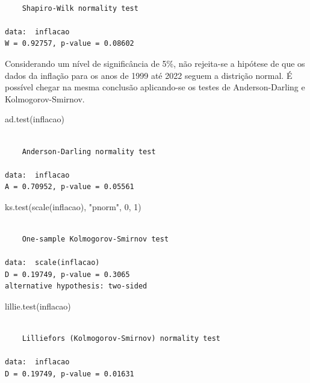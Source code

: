 \documentclass[
  letterpaper,
  DIV=11,
  numbers=noendperiod]{scrartcl}
\newenvironment{Shaded}{\begin{snugshade}}{\end{snugshade}}
\newcommand{\DecValTok}[1]{\textcolor[rgb]{0.68,0.00,0.00}{#1}}
\newcommand{\FunctionTok}[1]{\textcolor[rgb]{0.28,0.35,0.67}{#1}}
\newcommand{\NormalTok}[1]{\textcolor[rgb]{0.00,0.23,0.31}{#1}}
\newcommand{\StringTok}[1]{\textcolor[rgb]{0.13,0.47,0.30}{#1}}
\begin{document}
\begin{verbatim}

    Shapiro-Wilk normality test

data:  inflacao
W = 0.92757, p-value = 0.08602
\end{verbatim}

Considerando um nível de significância de 5\%, não rejeita-se a hipótese
de que os dados da inflação para os anos de 1999 até 2022 seguem a
distrição normal. É possível chegar na mesma conclusão aplicando-se os
testes de Anderson-Darling e Kolmogorov-Smirnov.

\begin{Shaded}
\begin{Highlighting}[]
\FunctionTok{ad.test}\NormalTok{(inflacao)}
\end{Highlighting}
\end{Shaded}

\begin{verbatim}

    Anderson-Darling normality test

data:  inflacao
A = 0.70952, p-value = 0.05561
\end{verbatim}

\begin{Shaded}
\begin{Highlighting}[]
\FunctionTok{ks.test}\NormalTok{(}\FunctionTok{scale}\NormalTok{(inflacao), }\StringTok{"pnorm"}\NormalTok{, }\DecValTok{0}\NormalTok{, }\DecValTok{1}\NormalTok{)}
\end{Highlighting}
\end{Shaded}

\begin{verbatim}

    One-sample Kolmogorov-Smirnov test

data:  scale(inflacao)
D = 0.19749, p-value = 0.3065
alternative hypothesis: two-sided
\end{verbatim}

\begin{Shaded}
\begin{Highlighting}[]
\FunctionTok{lillie.test}\NormalTok{(inflacao)}
\end{Highlighting}
\end{Shaded}

\begin{verbatim}

    Lilliefors (Kolmogorov-Smirnov) normality test

data:  inflacao
D = 0.19749, p-value = 0.01631
\end{verbatim}
\end{document}
